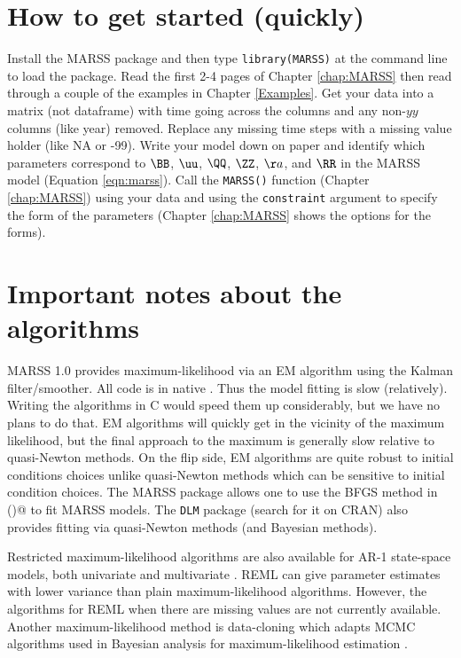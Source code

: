 \section{How to get started (quickly)}

Install the MARSS package and then type \texttt{library(MARSS)} at the command line to load the package.  Read the first 2-4 pages of Chapter \ref{chap:MARSS} then read through a couple of the examples in Chapter \ref{Examples}.  Get your data into a matrix (not dataframe) with time going across the columns and any non-$yy$ columns (like year) removed.  Replace any missing time steps with a missing value holder (like NA or -99).  Write your model down on paper and identify which parameters correspond to $\BB$, $\uu$, $\QQ$, $\ZZ$, $\aa$, and $\RR$ in the MARSS model (Equation \ref{eqn:marss}).  Call the \texttt{MARSS()} function (Chapter \ref{chap:MARSS}) using your data and using the \texttt{constraint} argument to specify the form of the parameters (Chapter \ref{chap:MARSS} shows the options for the forms).

\section{Important notes about the algorithms}

MARSS 1.0 provides maximum-likelihood via an EM algorithm using the Kalman filter/smoother.  All code is in native \R.  Thus the model fitting is slow (relatively).  Writing the algorithms in C would speed them up considerably, but we have no plans to do that.  EM algorithms will quickly get in the vicinity of the maximum likelihood, but the final approach to the maximum is generally slow relative to quasi-Newton methods.  On the flip side, EM algorithms are quite robust to initial conditions choices unlike quasi-Newton methods which can be sensitive to initial condition choices.  The MARSS package allows one to use the BFGS method in \verb@optim()@ to fit MARSS models. The \texttt{DLM} package (search for it on CRAN) also provides fitting via quasi-Newton methods (and Bayesian methods).

Restricted maximum-likelihood algorithms are also available for AR-1 state-space models, both univariate \citep{Staplesetal2004} and multivariate \citep{Hinrichsen2009}.  REML can give parameter estimates with lower variance than plain maximum-likelihood algorithms.  However, the algorithms for REML when there are missing values are not currently available.  Another maximum-likelihood method is data-cloning which adapts MCMC algorithms used in Bayesian analysis for maximum-likelihood estimation \citep{Leleetal2007}.  

